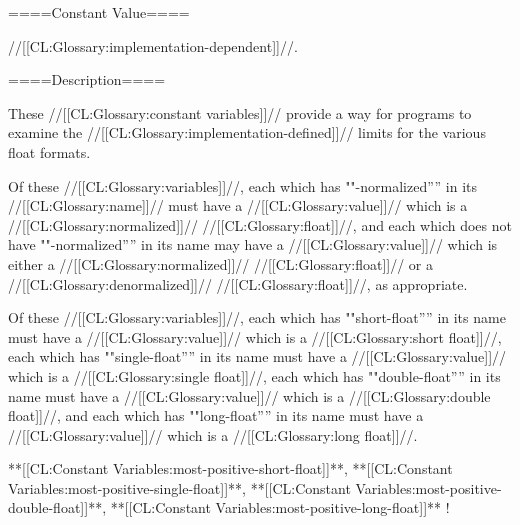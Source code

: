 
====Constant Value====

//[[CL:Glossary:implementation-dependent]]//.

====Description====

These //[[CL:Glossary:constant variables]]// provide a way for programs to examine the //[[CL:Glossary:implementation-defined]]// limits for the various float formats.

Of these //[[CL:Glossary:variables]]//, each which has ""-normalized'''' in its //[[CL:Glossary:name]]// must have a //[[CL:Glossary:value]]// which is a //[[CL:Glossary:normalized]]// //[[CL:Glossary:float]]//, and each which does not have ""-normalized'''' in its name may have a //[[CL:Glossary:value]]// which is either a //[[CL:Glossary:normalized]]// //[[CL:Glossary:float]]// or a //[[CL:Glossary:denormalized]]// //[[CL:Glossary:float]]//, as appropriate.

Of these //[[CL:Glossary:variables]]//, each which has ""short-float'''' in its name must have a //[[CL:Glossary:value]]// which is a //[[CL:Glossary:short float]]//, each which has ""single-float'''' in its name must have a //[[CL:Glossary:value]]// which is a //[[CL:Glossary:single float]]//, each which has ""double-float'''' in its name must have a //[[CL:Glossary:value]]// which is a //[[CL:Glossary:double float]]//, and each which has ""long-float'''' in its name must have a //[[CL:Glossary:value]]// which is a //[[CL:Glossary:long float]]//.

\beginlist

\itemitem{\bull} **[[CL:Constant Variables:most-positive-short-float]]**, **[[CL:Constant Variables:most-positive-single-float]]**, **[[CL:Constant Variables:most-positive-double-float]]**, **[[CL:Constant Variables:most-positive-long-float]]** \Vskip 18pt!

